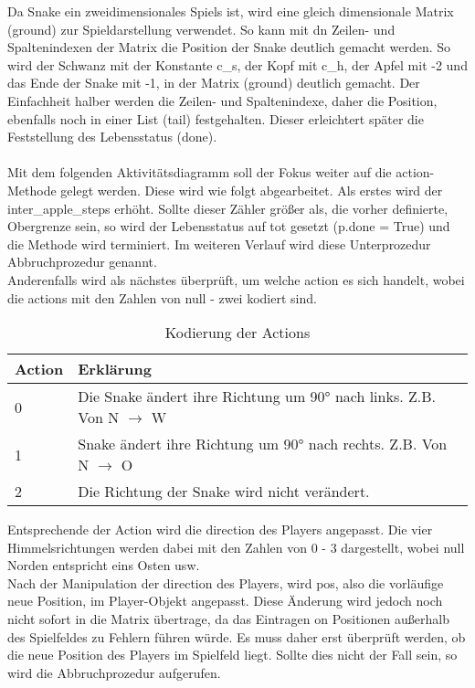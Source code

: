 Da Snake ein zweidimensionales Spiels ist, wird eine gleich dimensionale Matrix (ground) zur Spieldarstellung verwendet.
So kann mit dn Zeilen- und Spaltenindexen der Matrix die Position der Snake deutlich gemacht werden. So wird der Schwanz mit der Konstante c\_s, der Kopf mit c\_h, der Apfel mit -2 und das Ende der Snake mit -1, in der Matrix (ground) deutlich gemacht.
Der Einfachheit halber werden die Zeilen- und Spaltenindexe, daher die Position, ebenfalls noch in einer List (tail) festgehalten. Dieser erleichtert später die Feststellung des Lebensstatus (done).\\
\\Mit dem folgenden Aktivitätsdiagramm soll der Fokus weiter auf die action-Methode gelegt werden. Diese wird wie folgt abgearbeitet.
Als erstes wird der inter\_apple\_steps erhöht. Sollte dieser Zähler größer als, die vorher definierte, Obergrenze sein, so wird der Lebensstatus auf tot gesetzt (p.done = True) und die Methode wird terminiert. Im weiteren Verlauf wird diese Unterprozedur Abbruchprozedur genannt.\\
Anderenfalls wird als nächstes überprüft, um welche action es sich handelt, wobei die actions mit den Zahlen von null - zwei kodiert sind.
\begin{longtable}[h]{|p{4cm}|p{\linewidth - 5cm}|}
	\caption{Kodierung der Actions}
	\label{tab:Aktionscodierung} 
	\endfirsthead
	\endhead
	\hline
	Action & Erklärung \\
	\hline
	0 & Die Snake ändert ihre Richtung um 90° nach links. Z.B. Von N $\longrightarrow$ W \\
	\hline
	1 & Snake ändert ihre Richtung um 90° nach rechts. Z.B. Von N $\longrightarrow$ O \\
	\hline
	2 & Die Richtung der Snake wird nicht verändert. \\
	\hline
\end{longtable}
Entsprechende der Action wird die direction des Players angepasst. Die vier Himmelsrichtungen werden dabei mit den Zahlen von 0 - 3 dargestellt, wobei null Norden entspricht eins Osten usw.\\
Nach der Manipulation der direction des Players, wird pos, also die vorläufige neue Position, im Player-Objekt angepasst. 
Diese Änderung wird jedoch noch nicht sofort in die Matrix übertrage, da das Eintragen on Positionen außerhalb des Spielfeldes zu Fehlern führen würde. Es muss daher erst überprüft werden, ob die neue Position des Players im Spielfeld liegt. Sollte dies nicht der Fall sein, so wird die Abbruchprozedur aufgerufen.\\
